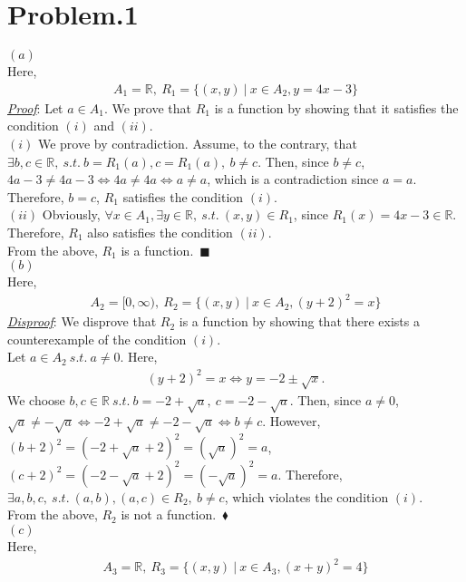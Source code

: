 \documentclass[12pt]{article}
\begin{document}
\section*{Problem.1}
$(a)$\\
Here,
\begin{gather*}
A_1 = \mathbb{R},~ R_1 = \{(x,y) ~|~ x \in A_2, y = 4x - 3 \} 
\end{gather*}
\underline{\textit{Proof}}: Let $a \in A_1$. We prove that $R_1$ is a function by showing that it satisfies the condition $(i)$ and $(ii)$.\\[1em]
$(i)$ We prove by contradiction. Assume, to the contrary, that $\exists b,c \in \mathbb{R}, ~s.t.~ b = R_1(a), c = R_1(a),~ b \neq c$. Then, since $b \neq c$, $4a - 3 \neq 4a - 3 \Leftrightarrow 4a \neq 4a \Leftrightarrow a \neq a$, which is a contradiction since $a = a$. Therefore, $b = c$, $R_1$ satisfies the condition $(i)$.\\[1em]
$(ii)$
Obviously, $\forall x \in A_1, \exists y \in \mathbb{R}, ~s.t.~ (x, y) \in R_1$, since $R_1(x) = 4x - 3 \in \mathbb{R}$. Therefore, $R_1$ also satisfies the condition $(ii)$.\\[1em]
From the above, $R_1$ is a function.~$\blacksquare$\\[1em]
$(b)$\\
Here,
\begin{gather*}
A_2 = [0,\infty),~ R_2 = \{(x,y) ~|~ x \in A_2, (y+2)^2 = x \}
\end{gather*}
\underline{\textit{Disproof}}: We disprove that $R_2$ is a function by showing that there exists a counterexample of the condition $(i)$.\\
Let $a \in A_2 ~s.t.~ a \neq 0$. Here,
\begin{gather*}
(y+2)^2 = x \Leftrightarrow y = - 2 \pm \sqrt{x}.
\end{gather*}
We choose $b,c \in \mathbb{R} ~s.t.~ b = - 2 + \sqrt{a},~c = - 2 - \sqrt{a}$. Then, since $a \neq 0$, $\sqrt{a} \neq -\sqrt{a} \Leftrightarrow - 2 + \sqrt{a} \neq - 2 - \sqrt{a} \Leftrightarrow b \neq c$. However, $(b+2)^2 = (- 2 + \sqrt{a} + 2)^2 = (\sqrt{a})^2 = a$, $(c+2)^2 = (- 2 - \sqrt{a} + 2)^2 = (- \sqrt{a})^2 = a$. Therefore, $\exists a, b, c, ~s.t.~ (a,b),(a,c) \in R_2,~b \neq c$, which violates the condition $(i)$.\\[1em]
From the above, $R_2$ is not a function.~$\blacklozenge$\\[1em]
$(c)$\\
Here,
\begin{gather*}
A_3 = \mathbb{R},~ R_3 = \{(x,y) ~|~ x \in A_3, (x + y)^2 = 4 \}
\end{gather*}
\end{document}
